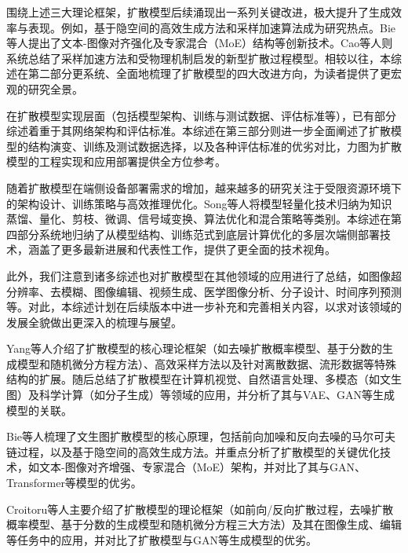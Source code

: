 \documentclass[11pt,a4paper,UTF8]{ctexart}
\begin{document}
围绕上述三大理论框架，扩散模型后续涌现出一系列关键改进，极大提升了生成效率与表现。例如，基于隐空间的高效生成方法和采样加速算法成为研究热点\cite{bie2024renaissance,cao2024survey,fuest2024diffusion,jiang2024survey}。Bie等人\cite{bie2024renaissance}提出了文本-图像对齐强化及专家混合（MoE）结构等创新技术。Cao等人\cite{cao2024survey}则系统总结了采样加速方法和受物理机制启发的新型扩散过程模型。相较以往，本综述在第二部分更系统、全面地梳理了扩散模型的四大改进方向，为读者提供了更宏观的研究全景。

在扩散模型实现层面（包括模型架构、训练与测试数据、评估标准等），已有部分综述着重于其网络架构\cite{bie2024renaissance,jiang2024survey,fuest2024diffusion}和评估标准\cite{jiang2024survey,bie2024renaissance}。本综述在第三部分则进一步全面阐述了扩散模型的结构演变、训练及测试数据选择，以及各种评估标准的优劣对比，力图为扩散模型的工程实现和应用部署提供全方位参考。

随着扩散模型在端侧设备部署需求的增加，越来越多的研究关注于受限资源环境下的架构设计、训练策略与高效推理优化。Song等人\cite{song2024lightweight}将模型轻量化技术归纳为知识蒸馏、量化、剪枝、微调、信号域变换、算法优化和混合策略等类别。本综述在第四部分系统地归纳了从模型结构、训练范式到底层计算优化的多层次端侧部署技术，涵盖了更多最新进展和代表性工作，提供了更全面的技术视角。

此外，我们注意到诸多综述\cite{yang2023diffusion,croitoru2023diffusion,song2024lightweight,cao2024survey,he2025diffusion}也对扩散模型在其他领域的应用进行了总结，如图像超分辨率、去模糊、图像编辑、视频生成、医学图像分析、分子设计、时间序列预测等。对此，本综述计划在后续版本中进一步补充和完善相关内容，以求对该领域的发展全貌做出更深入的梳理与展望。


\iffalse
Yang等人\cite{yang2023diffusion}介绍了扩散模型的核心理论框架（如去噪扩散概率模型、基于分数的生成模型和随机微分方程方法）、高效采样方法以及针对离散数据、流形数据等特殊结构的扩展。随后总结了扩散模型在计算机视觉、自然语言处理、多模态（如文生图）及科学计算（如分子生成）等领域的应用，并分析了其与VAE、GAN等生成模型的关联。

Bie等人\cite{bie2024renaissance}梳理了文生图扩散模型的核心原理，包括前向加噪和反向去噪的马尔可夫链过程，以及基于隐空间的高效生成方法。并重点分析了扩散模型的关键优化技术，如文本-图像对齐增强、专家混合（MoE）架构，并对比了其与GAN、Transformer等模型的优劣。

Croitoru等人\cite{croitoru2023diffusion}主要介绍了扩散模型的理论框架（如前向/反向扩散过程，去噪扩散概率模型、基于分数的生成模型和随机微分方程三大方法）及其在图像生成、编辑等任务中的应用，并对比了扩散模型与GAN等生成模型的优劣。
\end{document}
